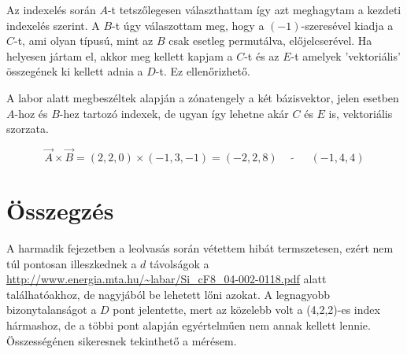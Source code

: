 \documentclass[a4paper,12pt]{article}
\begin{document}
\vspace{5mm}

\par Az indexelés során $A$-t tetszőlegesen választhattam így azt meghagytam a kezdeti indexelés szerint. A $B$-t úgy válaszottam meg, hogy a $(-1)$-szeresével kiadja a $C$-t, ami olyan típusú, mint az $B$ csak esetleg permutálva, előjelcserével. Ha helyesen jártam el, akkor meg kellett kapjam a $C$-t és az $E$-t amelyek 'vektoriális' összegének ki kellett adnia a $D$-t. Ez ellenőrizhető.

\vspace{5mm}

\par A labor alatt megbeszéltek alapján a zónatengely a két bázisvektor, jelen esetben $A$-hoz és $B$-hez tartozó indexek, de ugyan így lehetne akár $C$ és $E$ is, vektoriális szorzata.

\begin{equation*}
\vec{A} \times \vec{B} = (2,2,0) \times (-1,3,-1) = (-2, 2, 8) \quad \tilde \quad \quad (-1, 4, 4)
\end{equation*}

\section{Összegzés}

\par A harmadik fejezetben a leolvasás során vétettem hibát termszetesen, ezért nem túl pontosan illeszkednek a $d$ távolságok a \url{http://www.energia.mta.hu/~labar/Si_cF8_04-002-0118.pdf} alatt találhatóakhoz, de nagyjából be lehetett lőni azokat. A legnagyobb bizonytalanságot a $D$ pont jelentette, mert az közelebb volt a (4,2,2)-es index hármashoz, de a többi pont alapján egyértelműen nem annak kellett lennie. Összességénen sikeresnek tekinthető a mérésem.
\end{document}
